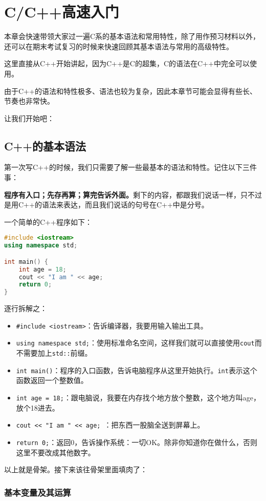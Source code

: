 \documentclass[../main.tex]{subfiles}
\begin{document}
\chapter{C/C++高速入门}

本章会快速带领大家过一遍C系的基本语法和常用特性，除了用作预习材料以外，还可以在期末考试复习的时候来快速回顾其基本语法与常用的高级特性。

这里直接从C++开始讲起，因为C++是C的超集，C的语法在C++中完全可以使用。

由于C++的语法和特性极多、语法也较为复杂，因此本章节可能会显得有些长、节奏也非常快。

让我们开始吧：

\section{C++的基本语法}

第一次写C++的时候，我们只需要了解一些最基本的语法和特性。记住以下三件事：

\textbf{程序有入口；先存再算；算完告诉外面。}剩下的内容，都跟我们说话一样，只不过是用C++的语法来表达，而且我们说话的句号在C++中是分号。

一个简单的C++程序如下：
\begin{lstlisting}[language=C++]
#include <iostream>
using namespace std;

int main() {
    int age = 18;
    cout << "I am " << age;
    return 0;
}
\end{lstlisting}
逐行拆解之：
\begin{itemize}
  \item \texttt{\#include <iostream>}：告诉编译器，我要用输入输出工具。
  \item \texttt{using namespace std;}：使用标准命名空间，这样我们就可以直接使用\texttt{cout}而不需要加上\texttt{std::}前缀。
  \item \texttt{int main()}：程序的入口函数，告诉电脑程序从这里开始执行。\texttt{int}表示这个函数返回一个整数值。
  \item \texttt{int age = 18;}：跟电脑说，我要在内存找个地方放个整数，这个地方叫age，放个18进去。
  \item \texttt{cout << "I am " << age; }：把东西一股脑全送到屏幕上。
  \item \texttt{return 0;}：返回0，告诉操作系统：一切OK。除非你知道你在做什么，否则这里不要改成其他数字。
\end{itemize}

以上就是骨架。接下来该往骨架里面填肉了：

\subsection{基本变量及其运算}
\end{document}
